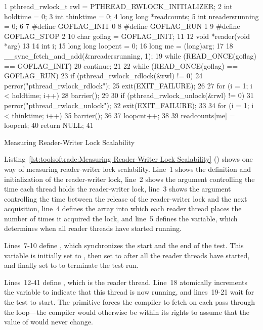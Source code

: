 \begin{listing}[tbp]
{ \scriptsize
\begin{verbbox}
  1 pthread_rwlock_t rwl = PTHREAD_RWLOCK_INITIALIZER;
  2 int holdtime = 0;
  3 int thinktime = 0;
  4 long long *readcounts;
  5 int nreadersrunning = 0;
  6 
  7 #define GOFLAG_INIT 0
  8 #define GOFLAG_RUN  1
  9 #define GOFLAG_STOP 2
 10 char goflag = GOFLAG_INIT;
 11 
 12 void *reader(void *arg)
 13 {
 14   int i;
 15   long long loopcnt = 0;
 16   long me = (long)arg;
 17 
 18   __sync_fetch_and_add(&nreadersrunning, 1);
 19   while (READ_ONCE(goflag) == GOFLAG_INIT) {
 20     continue;
 21   }
 22   while (READ_ONCE(goflag) == GOFLAG_RUN) {
 23     if (pthread_rwlock_rdlock(&rwl) != 0) {
 24       perror("pthread_rwlock_rdlock");
 25       exit(EXIT_FAILURE);
 26     }
 27     for (i = 1; i < holdtime; i++) {
 28       barrier();
 29     }
 30     if (pthread_rwlock_unlock(&rwl) != 0) {
 31       perror("pthread_rwlock_unlock");
 32       exit(EXIT_FAILURE);
 33     }
 34     for (i = 1; i < thinktime; i++) {
 35       barrier();
 36     }
 37     loopcnt++;
 38   }
 39   readcounts[me] = loopcnt;
 40   return NULL;
 41 }
\end{verbbox}
}
\centering
\theverbbox
\caption{Measuring Reader-Writer Lock Scalability}
\label{lst:toolsoftrade:Measuring Reader-Writer Lock Scalability}
\end{listing}

Listing~\ref{lst:toolsoftrade:Measuring Reader-Writer Lock Scalability}
()
shows one way of measuring reader-writer lock scalability.
Line~1 shows the definition and initialization of the reader-writer
lock, line~2 shows the  argument controlling the
time each thread holds the reader-writer lock,
line~3 shows the  argument controlling the time between
the release of the reader-writer lock and the next acquisition,
line~4 defines the  array into which each reader thread
places the number of times it acquired the lock, and
line~5 defines the  variable, which
determines when all reader threads have started running.

Lines~7-10 define , which synchronizes the start and the
end of the test.
This variable is initially set to , then set to
 after all the reader threads have started, and finally
set to  to terminate the test run.

Lines~12-41 define , which is the reader thread.
Line~18 atomically increments the  variable
to indicate that this thread is now running, and
lines~19-21 wait for the test to start.
The  primitive forces the compiler to fetch 
on each pass through the loop---the compiler would otherwise be within its
rights to assume that the value of  would never change.

